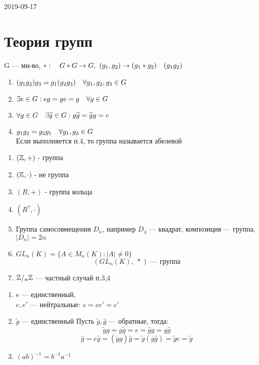 \documentclass[main]{subfiles}
\begin{document}
\begin{lect}{2019-09-17}
    \section{Теория групп}

    \begin{definition}[группа]
        G --- мн-во, $*: \quad G*G \rightarrow G,\ (g_1, g_2) \rightarrow (g_1*g_2)\quad (g_1g_2)$
        \begin{enumerate}
        	\item $(g_1g_2)g_3 = g_1(g_2g_3) \quad \forall g_1, g_2, g_3 \in G$
        	\item $\exists e \in G : eg = ge = g \quad \forall g \in G$
        	\item $\forall g \in G \quad \exists \widetilde{g} \in G : g\widetilde{g} = \widetilde{g}g = e$\\
                \hline
        	\item $g_1g_2 = g_2g_1 \quad \forall g_1, g_2 \in G$\\
            Если выполняется п.4, то группа называется абелевой
    	\end{enumerate}
    \end{definition}

    \begin{examples}
        \begin{enumerate}
            \item $(\mathbb{Z},+)$ - группа
            \item $(\mathbb{Z}, \cdot)$ - не группа
            \item $(R, +)$ - группа кольца
            \item $(R^*, \cdot)$
            \item Группа самосовмещения $D_n$, например $D_4$ --- квадрат, композиция --- группа, $|D_n|=2n$
            \item $GL_n(K) = \{A \in M_n(K) : |A| \neq 0\}$
            \[(GL_n(K),\ *) \text{ --- группа}\]
            \item $\mathbb{Z}/_n \mathbb{Z}$ --- частный случай п.3,4
        \end{enumerate}
    \end{examples}

    \begin{theorem}
        \begin{enumerate}
            \item e --- единственный, \\
                $e,e'$ --- нейтральные: $e=e e'=e'$
            \item $\widetilde{g}$ --- единственный
                Пусть $\widetilde{g},\hat{g}$ --- обратные, тогда:
                \[\widetilde{g}g = g\widetilde{g} = e = \hat{g}g = g\hat{g}\]
                \[\hat{g}=e \hat{g}=(\widetilde{g}g)\hat{g}=\widetilde{g}(g\hat{g})=\widetilde{g}e=\widetilde{g}\]
                \item $(a b)^{-1}=b^{-1}a^{-1}$


\end{enumerate}
\end{theorem}
\end{lect}
\end{document}
